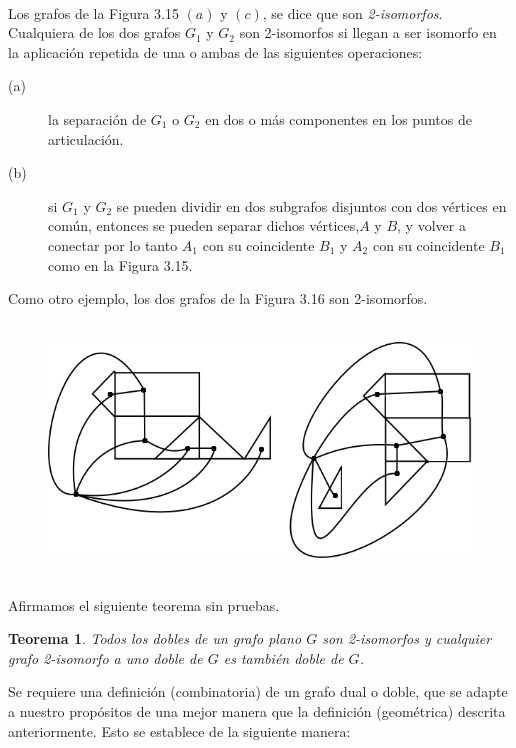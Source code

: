 \documentclass[10pt,a5paper]{book}
\newtheorem{teorema}{Teorema}[chapter]
\begin{document}
\hrulefill{}\\

Los grafos de la Figura 3.15 $(a)$ y $(c)$, se dice que son \emph{2-isomorfos}. Cualquiera de los dos grafos $G_1$ y $G_2$ son 2-isomorfos si llegan a ser isomorfo en la aplicación repetida de una o ambas de las siguientes operaciones:
\begin{description}
\item[(a)] la separación de $G_1$ o $G_2$ en dos o más componentes en los puntos de articulación.
\item[(b)] si $G_1$ y $G_2$ se pueden dividir en dos subgrafos disjuntos con dos vértices en común, entonces se pueden separar dichos vértices,$A$ y $B$, y volver a conectar por lo tanto $A_1$ con su coincidente $B_1$ y $A_2$ con su coincidente $B_1$ como en la Figura 3.15.
\end{description}

Como otro ejemplo, los dos grafos de la Figura 3.16 son 2-isomorfos.

\begin{figure}[H]
\caption{ }
\hrulefill{}\\
\hspace*{-.5in}\includegraphics[scale=.4]{Fig3_16.png}
\end{figure}
\hrulefill{}\\

Afirmamos el siguiente teorema sin pruebas.

\begin{teorema}
Todos los dobles de un grafo plano $G$ son 2-isomorfos y cualquier grafo 2-isomorfo a uno doble de $G$ es también doble de $G$.
\end{teorema}

Se requiere una definición (combinatoria) de un grafo dual o doble, que se adapte a nuestro propósitos de una mejor manera que la definición (geométrica) descrita anteriormente. Esto se establece de la siguiente manera:
\end{document}
